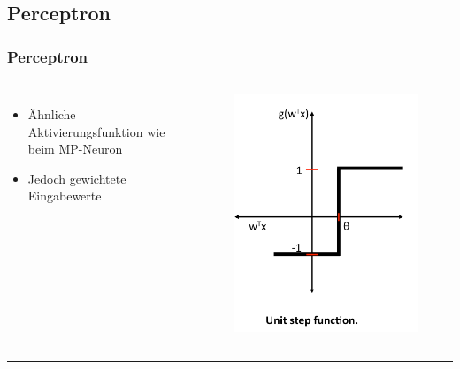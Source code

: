 \subsection{Perceptron}

\begin{frame}
\frametitle{Perceptron}

\begin{columns}

\begin{itemize}
\item Ähnliche Aktivierungsfunktion wie beim MP-Neuron
\item Jedoch gewichtete Eingabewerte
\end{itemize}


\begin{figure}
\includegraphics[width=.8\linewidth]{./geschichtliches/perceptron/img/perceptron_einheitsSprungfunktion_alpha}
\end{figure}

\end{columns}


\hspace{1mm}
\hrule


\begin{columns}


\end{columns}
\end{frame}
